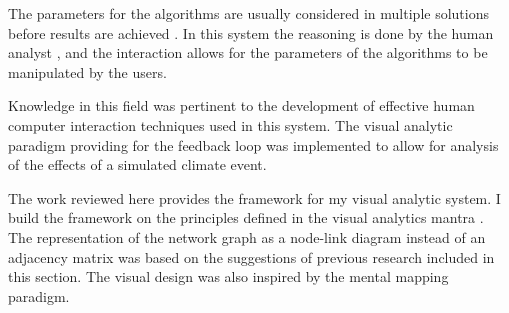 The parameters for the algorithms are usually considered in multiple solutions before results are achieved \citep{hund2016visual}. In this system the reasoning is done by the human analyst \citep{andrienko2011challenging}, and the interaction allows for the parameters of the algorithms to be manipulated by the users.\par
Knowledge in this field was pertinent to the development of effective human computer interaction techniques used in this system. The visual analytic paradigm providing for the feedback loop was implemented to allow for analysis of the effects of a simulated climate event.\par
The work reviewed here provides the framework for my visual analytic system. I build the framework on the principles defined in the visual analytics mantra \citep{keim2006challenges}. The representation of the network graph as a node-link diagram instead of an adjacency matrix was based on the suggestions of previous research included in this section. The visual design was also inspired by the mental mapping paradigm.\par